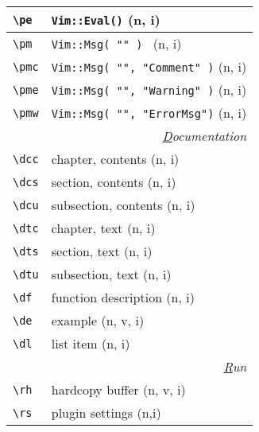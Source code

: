 \documentclass[oneside,10pt,landscape,DIV16]{scrartcl}
\begin{document}
\begin{multicols}{3}
\begin{center}
\begin{tabular}[]{|p{11mm}|p{60mm}|}
\hline \verb'\pe'   & \texttt{Vim::Eval()} \hfill (n, i)\\
\hline \verb'\pm'   & \texttt{Vim::Msg( "" )           } \hfill (n, i)\\
\hline \verb'\pmc'  & \texttt{Vim::Msg( "", "Comment" )} \hfill (n, i)\\
\hline \verb'\pme'  & \texttt{Vim::Msg( "", "Warning" )} \hfill (n, i)\\
\hline \verb'\pmw'  & \texttt{Vim::Msg( "", "ErrorMsg")} \hfill (n, i)\\
\hline
\hline
\multicolumn{2}{|r|}{\textsl{\underline{D}ocumentation}}                 \\[1.0ex]
\hline \verb'\dcc' & chapter, contents             \hfill (n, i)\\
\hline \verb'\dcs' & section, contents             \hfill (n, i)\\
\hline \verb'\dcu' & subsection, contents          \hfill (n, i)\\
\hline \verb'\dtc' & chapter, text                 \hfill (n, i)\\
\hline \verb'\dts' & section, text                 \hfill (n, i)\\
\hline \verb'\dtu' & subsection, text              \hfill (n, i)\\
\hline \verb'\df'  & function description          \hfill (n, i)\\
\hline \verb'\de'  & example                       \hfill (n, v, i)\\
\hline \verb'\dl'  & list item                     \hfill (n, i)\\
\hline
\hline
\multicolumn{2}{|r|}{\textsl{\underline{R}un}} \\[1.0ex]
\hline \verb'\rh'    & hardcopy buffer                          \hfill (n, v, i)\\
\hline \verb'\rs'    & plugin settings \hfill (n,i)\\
\hline
\end{tabular}\\
%
%
\end{center}%
\end{multicols}%
%
\end{document}
